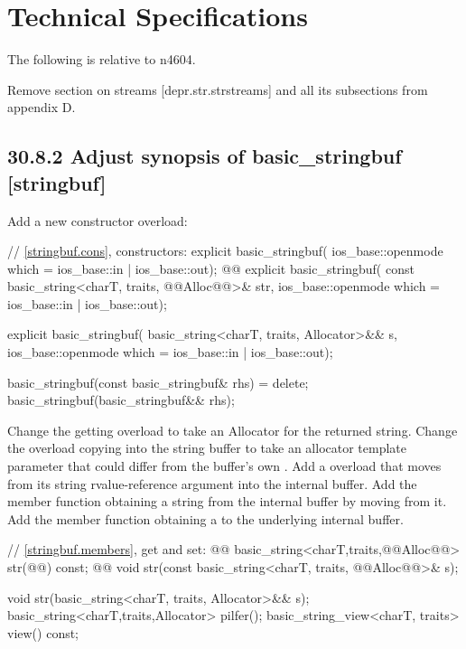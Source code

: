 \documentclass[ebook,11pt,article]{memoir}
\begin{document}
\chapter{Technical Specifications}
The following is relative to n4604.

Remove section on  streams [depr.str.strstreams] and all its subsections from appendix D.

\section{30.8.2 Adjust synopsis of basic\_stringbuf [stringbuf]}
Add a new constructor overload:
\begin{codeblock}
    // \ref{stringbuf.cons}, constructors:
    explicit basic_stringbuf(
      ios_base::openmode which = ios_base::in | ios_base::out);
    @@
    explicit basic_stringbuf(
      const basic_string<charT, traits, @@Alloc@@>& str,
      ios_base::openmode which = ios_base::in | ios_base::out);
\end{codeblock}
\begin{addedblock}\begin{codeblock}
    explicit basic_stringbuf(
      basic_string<charT, traits, Allocator>&& s,
      ios_base::openmode which = ios_base::in | ios_base::out);
\end{codeblock}\end{addedblock}
\begin{codeblock}
    basic_stringbuf(const basic_stringbuf& rhs) = delete;
    basic_stringbuf(basic_stringbuf&& rhs);
\end{codeblock}

Change the getting  overload to take an Allocator for the returned string. 
Change the  overload copying into the string buffer to take an allocator template parameter that could differ from the buffer's own . 
Add a  overload that moves from its string rvalue-reference argument into the internal buffer.
Add the  member function obtaining a string from the internal buffer by moving from it. 
Add the  member function obtaining a  to the underlying internal buffer.

\begin{codeblock}
    // \ref{stringbuf.members}, get and set:
    @@
    basic_string<charT,traits,@@Alloc@@> str(@@) const;
    @@
    void str(const basic_string<charT, traits, @@Alloc@@>& s);
\end{codeblock}
\begin{addedblock}
\begin{codeblock}
    void str(basic_string<charT, traits, Allocator>&& s);
    basic_string<charT,traits,Allocator> pilfer();
    basic_string_view<charT, traits> view() const;
\end{codeblock}
\end{addedblock}
\end{document}
